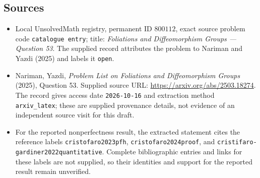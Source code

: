 \documentclass[11pt]{article}
\begin{document}
\subsection{Sources}
\begin{itemize}
\item Local UnsolvedMath registry, permanent ID \(800112\), exact source problem code \texttt{catalogue entry}; title: \emph{Foliations and Diffeomorphism Groups --- Question 53}. The supplied record attributes the problem to Nariman and Yazdi (2025) and labels it \texttt{open}.
\item Nariman, Yazdi, \emph{Problem List on Foliations and Diffeomorphism Groups} (2025), Question 53. Supplied source URL: \url{https://arxiv.org/abs/2503.18274}. The record gives access date \texttt{2026-10-16} and extraction method \texttt{arxiv\_latex}; these are supplied provenance details, not evidence of an independent source visit for this draft.
\item For the reported nonperfectness result, the extracted statement cites the reference labels \texttt{cristofaro2023pfh}, \texttt{cristofaro2024proof}, and \texttt{cristifaro-gardiner2022quantitative}. Complete bibliographic entries and links for these labels are not supplied, so their identities and support for the reported result remain unverified.
\end{itemize}
\end{document}
